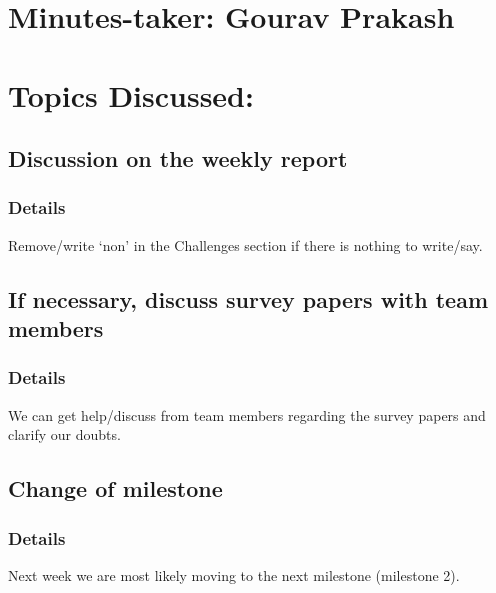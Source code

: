 \documentclass[11pt]{meetingmins} %
\begin{document}
\maketitle

\section{Minutes-taker: Gourav Prakash}

\section{Topics Discussed:}

\subsection{Discussion on the weekly report}
    \subsubsection{Details}
        \begin{hiddensubitems}
            \item
                Remove/write ‘non' in the Challenges section if there is nothing to write/say.
        \end{hiddensubitems}

\subsection{If necessary, discuss survey papers with team members}
    \subsubsection{Details}
        \begin{hiddensubitems}
            \item
                We can get help/discuss from team members regarding the survey papers and clarify our doubts.
        \end{hiddensubitems}

\subsection{Change of milestone}
    \subsubsection{Details}
        \begin{hiddensubitems}
            \item
                Next week we are most likely moving to the next milestone (milestone 2).
        \end{hiddensubitems}
\end{document}
